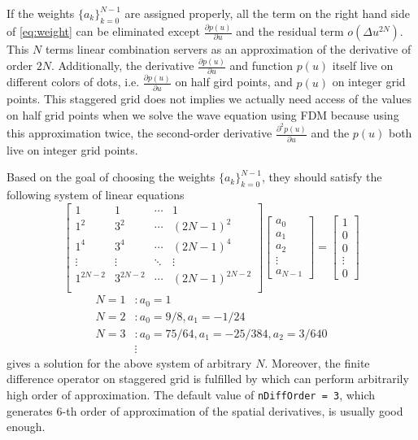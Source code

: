 \documentclass[11pt,titlepage]{article}
\theoremstyle{plain}
\theoremstyle{definition}
\theoremstyle{remark}
\numberwithin{equation}{section}
\begin{document}
If the weights $\{ a_k\}_{k=0}^{N-1}$ are assigned properly, all the term on the right hand side of \eqref{eq:weight} can be eliminated except $\frac{\partial p(u)}{\partial u}$ and the residual term $o(\Delta u^{2N})$. This $N$ terms linear combination servers as an approximation of the derivative of order $2N$. Additionally, the derivative $\frac{\partial p(u)}{\partial u}$ and function $p(u)$ itself live on different colors of dots, i.e. $\frac{\partial p(u)}{\partial u}$ on half gird points, and $p(u)$ on integer grid points. This staggered grid does not implies we actually need access of the values on half grid points when we solve the wave equation using FDM because using this approximation twice, the second-order derivative $\frac{\partial^2 p(u)}{\partial u}$ and the $p(u)$ both live on integer grid points.

Based on the goal of choosing the weights $\{a_k\}_{k=0}^{N-1}$, they should satisfy the following system of linear equations
\begin{equation*}
\begin{bmatrix}
  1 & 1 & \cdots & 1 \\
  1^2 & 3^2 & \cdots & (2N-1)^2 \\
  1^4 & 3^4 & \cdots & (2N-1)^4 \\
  \vdots & \vdots & \ddots & \vdots \\
  1^{2N-2} & 3^{2N-2} & \cdots & (2N-1)^{2N-2} \\
\end{bmatrix}
\begin{bmatrix}
  a_0 \\ a_1 \\ a_2 \\ \vdots \\ a_{N-1}
\end{bmatrix}
=
\begin{bmatrix}
  1 \\ 0 \\ 0 \\ \vdots \\ 0
\end{bmatrix}
\end{equation*}
\begin{equation*}
  \begin{aligned}
  N = 1&: a_0 = 1\\
  N = 2&: a_0 = 9/8, a_1 = -1/24\\
  N = 3&: a_0 = 75/64, a_1 = -25/384, a_2 = 3/640\\
  &\vdots
  \end{aligned}
\end{equation*}
 gives a solution for the above system of arbitrary $N$. Moreover, the finite difference operator on staggered grid is fulfilled by  which can perform arbitrarily high order of approximation. The default value of \texttt{nDiffOrder = 3}, which generates 6-th order of approximation of the spatial derivatives, is usually good enough.
\end{document}
